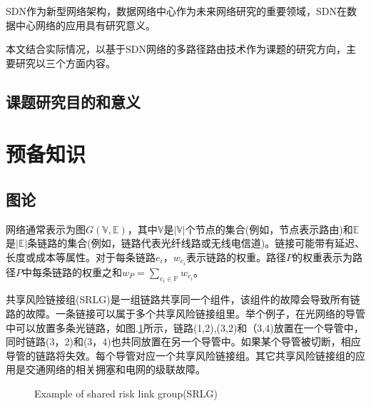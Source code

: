 SDN作为新型网络架构，数据网络中心作为未来网络研究的重要领域，SDN在数据中心网络的应用具有研究意义。

本文结合实际情况，以基于SDN网络的多路径路由技术作为课题的研究方向，主要研究以三个方面内容。


\subsection{课题研究目的和意义}


\section{预备知识}
\subsection{图论}
网络通常表示为图$G(\mathbb{V},\mathbb{E})$，其中$\mathbb{V}$是$|\mathbb{V}|$个节点的集合(例如，节点表示路由)和$\mathbb{E}$是$|\mathbb{E}|$条链路的集合(例如，链路代表光纤线路或无线电信道)。链接可能带有延迟、长度或成本等属性。对于每条链路$e_i$，$w_{e_i}$表示链路的权重。路径$P$的权重表示为路径$P$中每条链路的权重之和$w_P=\sum\limits_{e_i\in \mathbb{P}}w_{e_i}$。

共享风险链接组(SRLG)是一组链路共享同一个组件，该组件的故障会导致所有链路的故障。一条链接可以属于多个共享风险链接组里。举个例子，在光网络的导管中\cite{bhandari1994optimal}可以放置多条光链路，如图.\ref{fig:Logic shift operation}所示，链路(1,2),(3,2)和（3,4)放置在一个导管中，同时链路(3，2)和(3，4)也共同放置在另一个导管中。如果某个导管被切断，相应导管的链路将失效。每个导管对应一个共享风险链接组。其它共享风险链接组的应用是交通网络的相关拥塞和电网的级联故障\cite{coudert2007shared}。


\begin{figure}[htbp]
\centering
{}
\caption{Example of shared risk link group(SRLG)}\label{fig:SRLGgraph}
\label{fig:Logic shift operation}
\end{figure}

